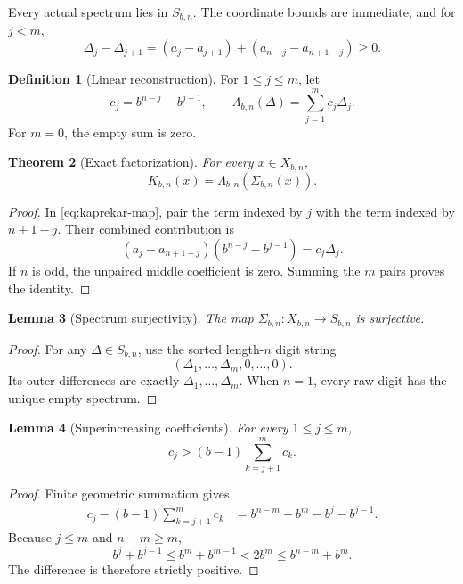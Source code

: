 \documentclass[11pt]{article}
\newtheorem{theorem}{Theorem}[section]
\newtheorem{lemma}[theorem]{Lemma}
\theoremstyle{definition}
\newtheorem{definition}[theorem]{Definition}
\theoremstyle{remark}
\newcommand{\1}{\mathbf{1}}
\begin{document}
Every actual spectrum lies in $S_{b,n}$.  The coordinate bounds are immediate,
and for $j<m$,
\[
 \Delta_j-\Delta_{j+1}
 =(a_j-a_{j+1})+(a_{n-j}-a_{n+1-j})\geq0.
\]

\begin{definition}[Linear reconstruction]
For $1\leq j\leq m$, let
\[
  c_j=b^{n-j}-b^{j-1},
  \qquad
  \Lambda_{b,n}(\Delta)=\sum_{j=1}^{m}c_j\Delta_j.
\]
For $m=0$, the empty sum is zero.
\end{definition}

\begin{theorem}[Exact factorization]\label{thm:factorization}
For every $x\in X_{b,n}$,
\[
  K_{b,n}(x)=\Lambda_{b,n}(\Sigma_{b,n}(x)).
\]
\end{theorem}

\begin{proof}
In \eqref{eq:kaprekar-map}, pair the term indexed by $j$ with the term indexed
by $n+1-j$.  Their combined contribution is
\[
  (a_j-a_{n+1-j})(b^{n-j}-b^{j-1})=c_j\Delta_j.
\]
If $n$ is odd, the unpaired middle coefficient is zero.  Summing the $m$
pairs proves the identity.
\end{proof}

\begin{lemma}[Spectrum surjectivity]\label{lem:surjectivity}
The map $\Sigma_{b,n}:X_{b,n}\to S_{b,n}$ is surjective.
\end{lemma}

\begin{proof}
For any $\Delta\in S_{b,n}$, use the sorted length-$n$ digit string
\[
  (\Delta_1,\ldots,\Delta_m,0,\ldots,0).
\]
Its outer differences are exactly $\Delta_1,\ldots,\Delta_m$.  When $n=1$,
every raw digit has the unique empty spectrum.
\end{proof}

\begin{lemma}[Superincreasing coefficients]\label{lem:superincreasing}
For every $1\leq j\leq m$,
\[
  c_j>(b-1)\sum_{k=j+1}^{m}c_k.
\]
\end{lemma}

\begin{proof}
Finite geometric summation gives
\begin{align*}
 c_j-(b-1)\sum_{k=j+1}^{m}c_k
 &=b^{n-m}+b^m-b^j-b^{j-1}.
\end{align*}
Because $j\leq m$ and $n-m\geq m$,
\[
 b^j+b^{j-1}
 \leq b^m+b^{m-1}
 <2b^m
 \leq b^{n-m}+b^m.
\]
The difference is therefore strictly positive.
\end{proof}
\end{document}
